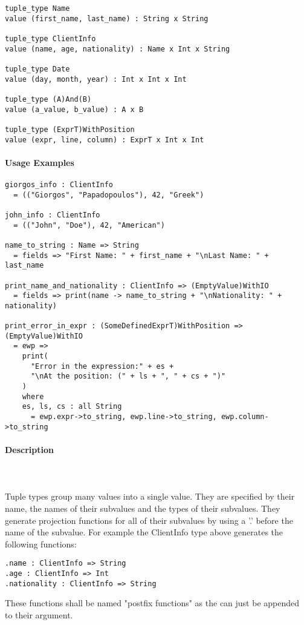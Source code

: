 \documentclass{article}
\def\pend{\mbox{} \\\\}
\begin{document}
\begin{verbatim}
tuple_type Name
value (first_name, last_name) : String x String

tuple_type ClientInfo
value (name, age, nationality) : Name x Int x String

tuple_type Date
value (day, month, year) : Int x Int x Int

tuple_type (A)And(B)
value (a_value, b_value) : A x B

tuple_type (ExprT)WithPosition
value (expr, line, column) : ExprT x Int x Int
\end{verbatim}

\paragraph{Usage Examples}

\begin{verbatim}
giorgos_info : ClientInfo
  = (("Giorgos", "Papadopoulos"), 42, "Greek")

john_info : ClientInfo
  = (("John", "Doe"), 42, "American")

name_to_string : Name => String
  = fields => "First Name: " + first_name + "\nLast Name: " + last_name

print_name_and_nationality : ClientInfo => (EmptyValue)WithIO
  = fields => print(name -> name_to_string + "\nNationality: " + nationality)

print_error_in_expr : (SomeDefinedExprT)WithPosition => (EmptyValue)WithIO
  = ewp =>
    print(
      "Error in the expression:" + es +
      "\nAt the position: (" + ls + ", " + cs + ")"
    )
    where
    es, ls, cs : all String
      = ewp.expr->to_string, ewp.line->to_string, ewp.column->to_string
\end{verbatim}

\paragraph{Description}\pend
Tuple types group many values into a single value. They are specified by their name,
the names of their subvalues and the types of their subvalues. They generate 
projection functions for all of their subvalues by using a '.' before the name of 
the subvalue. For example the ClientInfo type above generates the following 
functions:
\begin{verbatim}
.name : ClientInfo => String
.age : ClientInfo => Int
.nationality : ClientInfo => String
\end{verbatim}
These functions shall be named "postfix functions" as the can just be appended to
their argument.
\end{document}
